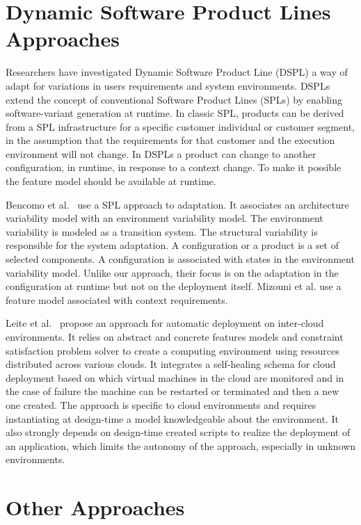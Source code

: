 \section{Dynamic Software Product Lines Approaches}
Researchers have investigated Dynamic Software Product Line (DSPL) a way of adapt for variations in users requirements and system environments.
 DSPLs extend the concept of conventional Software Product Lines (SPLs) by enabling software-variant generation at runtime. In classic SPL, products can be derived from a SPL infrastructure for a specific customer individual or customer segment, in the assumption that the requirements for that customer and the execution environment will not change. In DSPLs a product can change to another configuration, in runtime, in response to a context change. To make it possible the feature model should be available at runtime.\cite{bencomo_view_2012}

Bencomo et al.~\cite{bencomo_dynamically_2008} use a SPL approach to adaptation. It  associates an architecture variability model with an environment variability model. The environment variability is modeled as a transition system. The structural variability is responsible for the system adaptation. A configuration or a product is a set of selected components. A configuration is associated with states in the environment variability model. Unlike our approach, their focus is on the adaptation in the configuration at runtime but not on the deployment itself. Mizouni et al. \citep{mizouni_framework_2014} use a feature model associated with context requirements.

Leite et al.~\cite{ferreira_leite_user_2014} propose an approach for automatic deployment on inter-cloud environments. It relies on abstract and concrete features models and constraint satisfaction problem solver to create a computing environment using resources distributed across various clouds.
It integrates a self-healing schema for cloud deployment based on which virtual machines in the cloud are monitored and in the case of failure the machine can be
restarted or terminated and then a new one created.
The approach is specific to cloud environments and requires instantiating at design-time a model knowledgeable about the environment.
It also strongly depends on design-time created scripts to realize the deployment of an application, which limits the autonomy of the approach, especially in unknown environments.


\section{Other Approaches}

